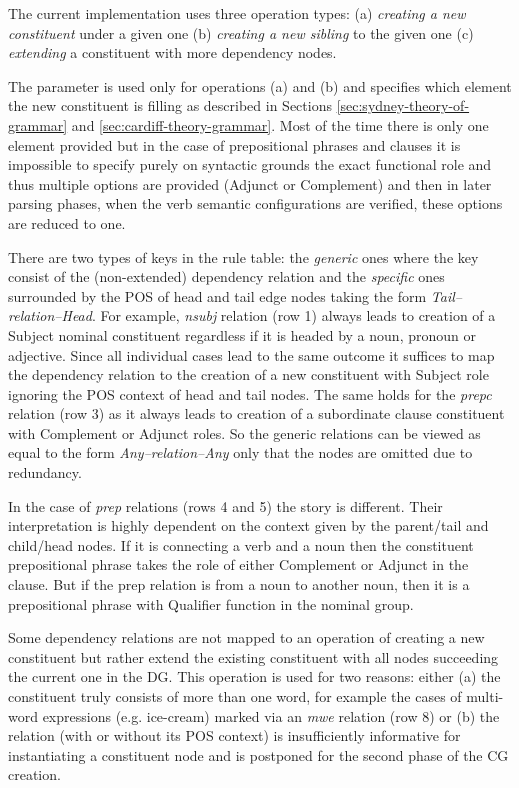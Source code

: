     The current implementation uses three operation types: (a) \textit{creating a new constituent} under a given  one (b) \textit{creating a new sibling} to the given one (c) \textit{extending} a constituent with more dependency nodes. 

    The parameter is used only for operations (a) and (b) and specifies which element the new constituent is filling as described in Sections \ref{sec:sydney-theory-of-grammar} and \ref{sec:cardiff-theory-grammar}. Most of the time there is only one element provided but in the case of prepositional phrases and clauses it is impossible to specify purely on syntactic grounds the exact functional role and thus multiple options are provided (Adjunct or Complement) and then in later parsing phases, when the verb semantic configurations are verified, these options are reduced to one.  

    There are two types of keys in the rule table: the \textit{generic} ones where the key consist of the (non-extended) dependency relation and the \textit{specific} ones surrounded by the POS of head and tail edge nodes taking the form \mbox{\textit{Tail--relation--Head}}. For example, \textit{nsubj} relation (row 1) always leads to creation of a Subject nominal constituent regardless if it is headed by a noun, pronoun or adjective. Since all individual cases lead to the same outcome it suffices to map the dependency relation to the creation of a new constituent with Subject role ignoring the POS context of head and tail nodes. The same holds for the \textit{prepc} relation (row 3) as it always leads to creation of a subordinate clause constituent with Complement or Adjunct roles. So the generic relations can be viewed as equal to the form \mbox{\textit{Any--relation--Any}} only that the nodes are omitted due to redundancy.

    In the case of \textit{prep} relations (rows 4 and 5) the story is different. Their interpretation is highly dependent on the context given by the parent/tail and child/head nodes. If it is connecting a verb and a noun then the constituent prepositional phrase takes the role of either Complement or Adjunct in the clause. But if the prep relation is from a noun to another noun, then it is a prepositional phrase with Qualifier function in the nominal group.

    Some dependency relations are not mapped to an operation of creating a new constituent but rather extend the existing constituent with all nodes succeeding the current one in the DG. This operation is used for two reasons: either (a) the constituent truly consists of more than one word, for example the cases of multi-word expressions (e.g. ice-cream) marked via an \textit{mwe} relation (row 8) or (b) the relation (with or without its POS context) is insufficiently informative for instantiating a constituent node and is postponed for the second phase of the CG creation.

